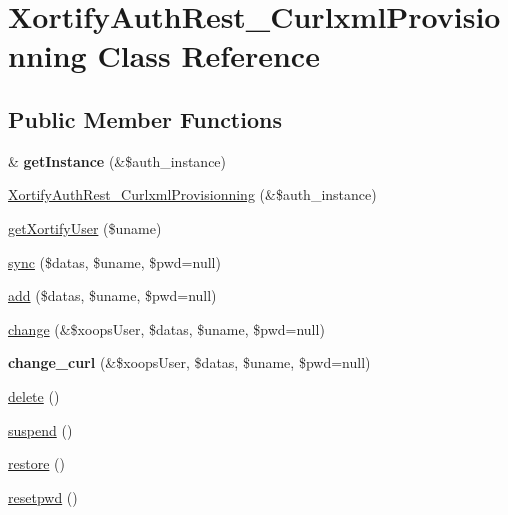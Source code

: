 \hypertarget{class_xortify_auth_rest___curlxml_provisionning}{\section{Xortify\-Auth\-Rest\-\_\-\-Curlxml\-Provisionning Class Reference}
\label{class_xortify_auth_rest___curlxml_provisionning}
}
\subsection*{Public Member Functions}
\begin{DoxyCompactItemize}
\item 
\hypertarget{class_xortify_auth_rest___curlxml_provisionning_a2c8eaa915c70d75289ac8a03686194f9}{\& {\bfseries get\-Instance} (\&\$auth\-\_\-instance)}\label{class_xortify_auth_rest___curlxml_provisionning_a2c8eaa915c70d75289ac8a03686194f9}

\item 
\hyperlink{class_xortify_auth_rest___curlxml_provisionning_adc9122f707545243b2cc3d8f5b542095}{Xortify\-Auth\-Rest\-\_\-\-Curlxml\-Provisionning} (\&\$auth\-\_\-instance)
\item 
\hyperlink{class_xortify_auth_rest___curlxml_provisionning_a041d726ac26672547ed1504e8e0117aa}{get\-Xortify\-User} (\$uname)
\item 
\hyperlink{class_xortify_auth_rest___curlxml_provisionning_a35dc08b0f2138eb818ff95345b73bcff}{sync} (\$datas, \$uname, \$pwd=null)
\item 
\hyperlink{class_xortify_auth_rest___curlxml_provisionning_adfc9fcef01e7bd7b2f47e8e79d51fc63}{add} (\$datas, \$uname, \$pwd=null)
\item 
\hyperlink{class_xortify_auth_rest___curlxml_provisionning_ae1f0971b9712c794620cf309164e43af}{change} (\&\$xoops\-User, \$datas, \$uname, \$pwd=null)
\item 
\hypertarget{class_xortify_auth_rest___curlxml_provisionning_aba6f598c234d191a3b3934f90b35fd9f}{{\bfseries change\-\_\-curl} (\&\$xoops\-User, \$datas, \$uname, \$pwd=null)}\label{class_xortify_auth_rest___curlxml_provisionning_aba6f598c234d191a3b3934f90b35fd9f}

\item 
\hyperlink{class_xortify_auth_rest___curlxml_provisionning_a13bdffdd926f26b825ea57066334ff01}{delete} ()
\item 
\hyperlink{class_xortify_auth_rest___curlxml_provisionning_ad73006a505121228f3b075c2409787d2}{suspend} ()
\item 
\hyperlink{class_xortify_auth_rest___curlxml_provisionning_aa1371f22826cf8cde4454c9b467203d0}{restore} ()
\item 
\hyperlink{class_xortify_auth_rest___curlxml_provisionning_a06d70fbd3a2db390b6f2530c0076628e}{resetpwd} ()
\end{DoxyCompactItemize}
